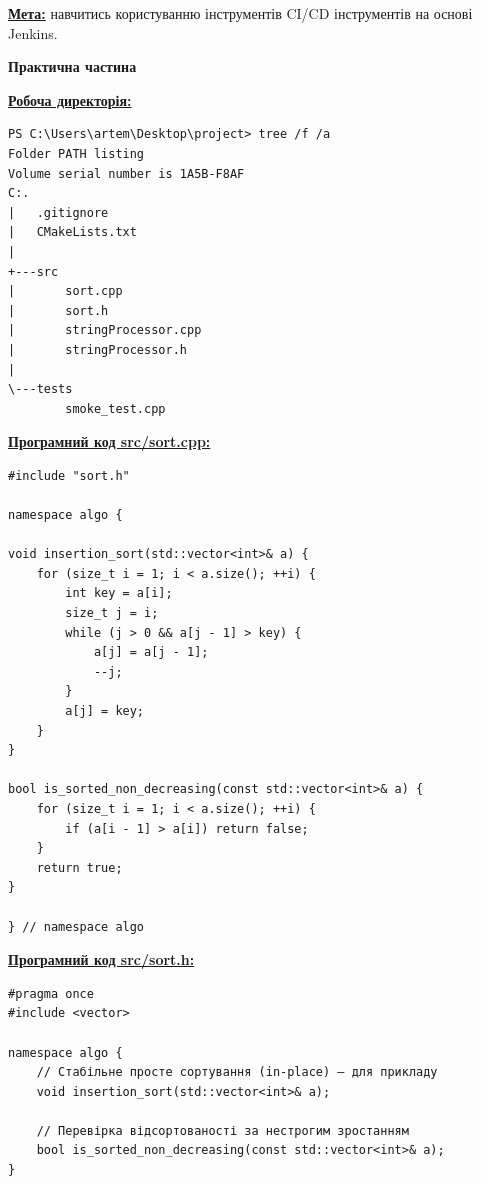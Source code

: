 \documentclass[a4paper,12pt]{article}
\begin{document}
    \vspace{1em}

    \textbf{\underline{Мета:}} навчитись користуванню інструментів CI/CD інструментів на основі Jenkins.

    \vspace{1em}

    \begin{center} \textbf{\Large Практична частина} \end{center}

    \textbf{\underline{Робоча директорія:}}

    \begin{verbatim}
PS C:\Users\artem\Desktop\project> tree /f /a 
Folder PATH listing
Volume serial number is 1A5B-F8AF
C:.
|   .gitignore
|   CMakeLists.txt
|   
+---src
|       sort.cpp
|       sort.h
|       stringProcessor.cpp
|       stringProcessor.h
|       
\---tests
        smoke_test.cpp
    \end{verbatim}

    \textbf{\underline{Програмний код src/sort.cpp:}}

    \begin{verbatim}
#include "sort.h"

namespace algo {

void insertion_sort(std::vector<int>& a) {
    for (size_t i = 1; i < a.size(); ++i) {
        int key = a[i];
        size_t j = i;
        while (j > 0 && a[j - 1] > key) {
            a[j] = a[j - 1];
            --j;
        }
        a[j] = key;
    }
}

bool is_sorted_non_decreasing(const std::vector<int>& a) {
    for (size_t i = 1; i < a.size(); ++i) {
        if (a[i - 1] > a[i]) return false;
    }
    return true;
}

} // namespace algo
    \end{verbatim}

    \newpage

    \textbf{\underline{Програмний код src/sort.h:}}

    \begin{verbatim}
#pragma once
#include <vector>

namespace algo {
    // Стабільне просте сортування (in-place) — для прикладу
    void insertion_sort(std::vector<int>& a);

    // Перевірка відсортованості за нестрогим зростанням
    bool is_sorted_non_decreasing(const std::vector<int>& a);
}
    \end{verbatim}
\end{document}
